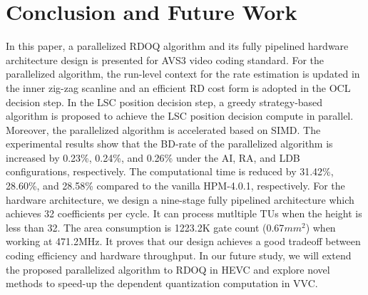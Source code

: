 \documentclass[lettersize,journal]{IEEEtran}
\begin{document}
\section{Conclusion and Future Work}
\label{sec:6}
In this paper, a parallelized RDOQ algorithm and its fully pipelined hardware architecture design is presented for AVS3 video coding standard. For the parallelized algorithm, the run-level context for the rate estimation is updated in the inner zig-zag scanline and an efficient RD cost form is adopted in the OCL decision step. In the LSC position decision step, a greedy strategy-based algorithm is proposed to achieve the LSC position decision compute in parallel. Moreover, the parallelized algorithm is accelerated based on SIMD. The experimental results show that the BD-rate of the parallelized algorithm is increased by 0.23\%, 0.24\%, and 0.26\% under the AI, RA, and LDB configurations, respectively. The computational time is reduced by 31.42\%, 28.60\%, and 28.58\% compared to the vanilla HPM-4.0.1, respectively. 
For the hardware architecture, we design a nine-stage fully pipelined architecture which achieves 32 coefficients per cycle. It can process mutltiple TUs when the height is less than 32. The area consumption is 1223.2K gate count (0.67$mm^2$) when working at 471.2MHz. It proves that our design achieves a good tradeoff between coding efficiency and hardware throughput. 
In our future study, we will extend the proposed parallelized algorithm to RDOQ in HEVC and explore novel methods to speed-up the dependent quantization computation in VVC. 






\end{document}
